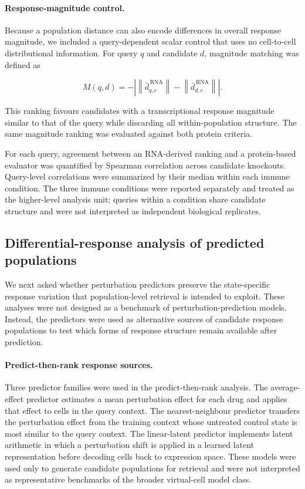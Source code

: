 \documentclass[11pt,letterpaper]{article}
\begin{document}
\paragraph{Response-magnitude control.}
Because a population distance can also encode differences in overall response magnitude, we
included a query-dependent scalar control that uses no cell-to-cell distributional information.
For query $q$ and candidate $d$, magnitude matching was defined as

$$
M(q,d)
=
-
\left|
\left\|
\bar d^{\,\mathrm{RNA}}_{q,c}
\right\|
-
\left\|
\bar d^{\,\mathrm{RNA}}_{d,c}
\right\|
\right|.
$$

This ranking favours candidates with a transcriptional response magnitude similar to that of the
query while discarding all within-population structure. The same magnitude ranking was evaluated
against both protein criteria.

For each query, agreement between an RNA-derived ranking and a protein-based evaluator was
quantified by Spearman correlation across candidate knockouts. Query-level correlations were
summarized by their median within each immune condition. The three immune conditions were reported
separately and treated as the higher-level analysis unit; queries within a condition share
candidate structure and were not interpreted as independent biological replicates.




\subsection*{Differential-response analysis of predicted populations}

We next asked whether perturbation predictors preserve the state-specific response variation that
population-level retrieval is intended to exploit. These analyses were not designed as a benchmark
of perturbation-prediction models. Instead, the predictors were used as alternative sources of
candidate response populations to test which forms of response structure remain available after
prediction.

\paragraph{Predict-then-rank response sources.}
Three predictor families were used in the predict-then-rank analysis. The average-effect predictor
estimates a mean perturbation effect for each drug and applies that effect to cells in the query
context. The nearest-neighbour predictor transfers the perturbation effect from the training context
whose untreated control state is most similar to the query context. The linear-latent predictor
implements latent arithmetic in which a perturbation shift is applied in a learned latent
representation before decoding cells back to expression space. These models were used only to
generate candidate populations for retrieval and were not interpreted as representative benchmarks
of the broader virtual-cell model class.
\end{document}
